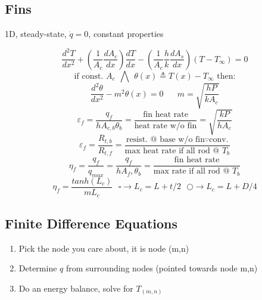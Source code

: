 \documentclass[twocolumn, 12pt]{article}
\begin{document}
\subsection*{Fins}
    \begin{center}
        1D, steady-state, \(\dot{q}=0\), constant properties
    \end{center}
    \begin{equation*}
        \frac{d^2T}{dx^2} + \left(\frac{1}{A_c}\frac{dA_c}{dx} \right)\frac{dT}{dx} -\left( \frac{1}{A_c} \frac{h}{k} \frac{dA_s}{dx} \right)(T-T_\infty) = 0
    \end{equation*}
    \begin{equation*}
        \text{if const. } A_c \hspace{5pt} \bigwedge \hspace{5pt}\theta(x) \triangleq T(x)- T_\infty \text{  then:}
    \end{equation*}
    \begin{equation*}
        \frac{d^2\theta}{dx^2} - m^2\theta(x) =0 \hspace{20pt} m = \sqrt{\frac{hP}{kA_c}}
    \end{equation*}
    \begin{equation*}
        \varepsilon_f = \frac{q_f}{hA_{c,b}\theta_b} = \frac{\text{fin heat rate}}{\text{heat rate w/o fin}} = \sqrt{\frac{kP}{hA_c}}
    \end{equation*}
    \begin{equation*}
        \varepsilon_f = \frac{R_{t,b}}{R_{t,f}} = \frac{\text{resist. @ base w/o fin} \because \text{conv.}}{\text{max heat rate if all rod @ }T_b}
    \end{equation*}
    \begin{equation*}
        \eta_f = \frac{q_f}{q_{max}} = \frac{q_f}{hA_f,\theta_b}=\frac{\text{fin heat rate}}{\text{max rate if all rod @ } T_b}
    \end{equation*}
    \begin{equation*}
        \eta_f = \frac{tanh(L_c)}{mL_c} \hspace{8pt} \square \rightarrow L_c = L +t/2 \hspace{8pt} \bigcirc \rightarrow L_c = L+D/4 
    \end{equation*}
\subsection*{Finite Difference Equations}
\begin{enumerate}
    \item Pick the node you care about, it is node (m,n)
    
    \item Determine \(q\) from surrounding nodes (pointed towards node m,n)
    
    \item Do an energy balance, solve for \(T_{(m,n)}\)
\end{enumerate}
\end{document}
